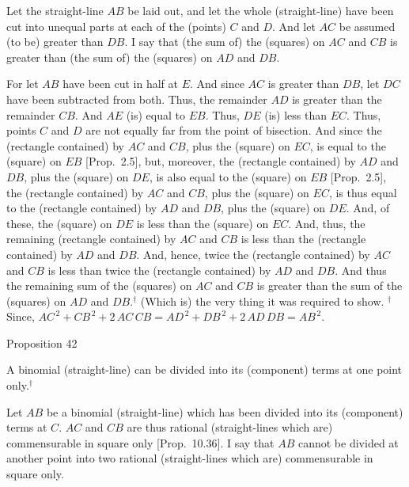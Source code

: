  \epsfysize=0.3in
\centerline{}
 
 Let the straight-line $AB$ be laid out, and let the whole (straight-line) have been cut
 into unequal parts at each of the (points) $C$ and $D$. And let $AC$ be assumed (to be) greater than $DB$. I say that (the sum of) the (squares) on
 $AC$ and $CB$ is greater than (the sum of) the (squares) on $AD$ and $DB$.
 
 For let $AB$ have been cut in half at $E$. And since $AC$ is greater than
 $DB$, let $DC$ have been subtracted from both. Thus, the remainder
 $AD$ is greater than the remainder $CB$. And $AE$ (is) equal to $EB$.
 Thus, $DE$ (is) less than $EC$. Thus, points $C$ and $D$ are not
 equally far from the point of bisection. And since the (rectangle
 contained) by $AC$ and $CB$, plus the (square) on $EC$,
 is equal to the (square) on $EB$ [Prop.~2.5], 
 but, moreover, the (rectangle contained) by $AD$ and $DB$, plus the
 (square) on $DE$, is also equal to the (square) on $EB$ [Prop.~2.5], the (rectangle contained) by $AC$ and
 $CB$, plus the (square) on $EC$, is thus equal to the (rectangle contained)
 by $AD$ and $DB$, plus the (square) on $DE$. And, of these, the
 (square) on $DE$ is less than the (square) on $EC$. And, thus, the remaining
 (rectangle contained) by $AC$ and $CB$ is  less than
 the (rectangle contained) by $AD$ and $DB$. And, hence, twice
 the (rectangle contained) by $AC$ and $CB$ is less than twice the
 (rectangle contained) by $AD$ and $DB$. And thus the remaining
 sum of the (squares) on $AC$ and $CB$ is greater than the sum of the
 (squares) on $AD$ and $DB$.$^\dag$  (Which is) the very thing it was required to show.
{\footnotesize\noindent$^\dag$ Since, $AC^{\,2}+CB^{\,2}+2\,AC\,CB=
 AD^{\,2}+DB^{\,2}
+2\,AD\,DB = AB^{\,2}$.} 


\begin{center}
{\large Proposition 42}
\end{center}
A binomial (straight-line) can be divided into
its (component) terms at one
point only.$^\dag$

\epsfysize=0.3in
\centerline{}

Let $AB$ be a binomial (straight-line) which has been divided into its
(component) terms at $C$. $AC$ and $CB$ are thus
rational (straight-lines which are) commensurable in square only [Prop.~10.36]. I say that $AB$ cannot be divided
at another point
into two rational (straight-lines which are) commensurable in square only.

